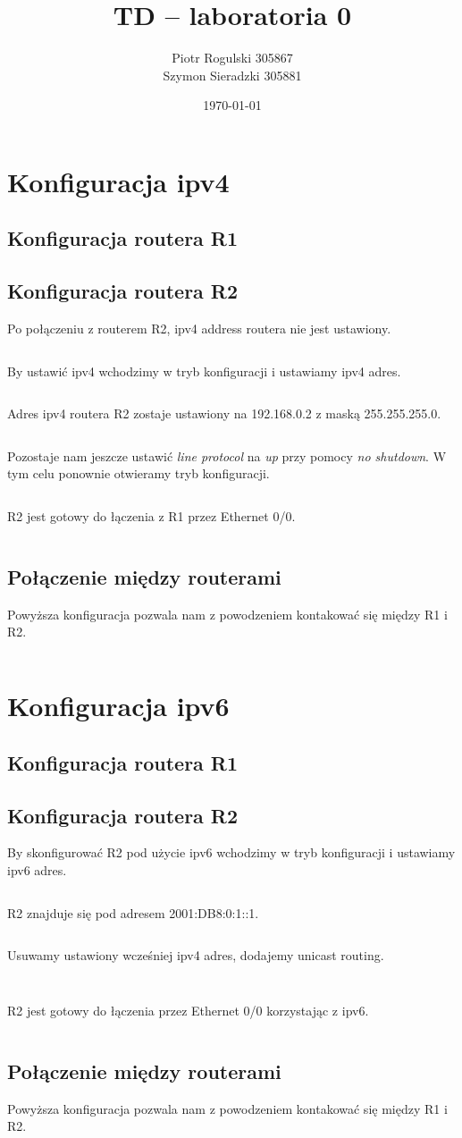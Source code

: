 \documentclass[a4paper,12pt,notitlepage]{article}
\title{\textbf{TD -- laboratoria 0}}
\author{Piotr Rogulski 305867 \\ Szymon Sieradzki 305881}
\date{\today}
\begin{document}
\maketitle


\section{Konfiguracja ipv4}
\subsection{Konfiguracja routera R1}
\subsection{Konfiguracja routera R2}
Po połączeniu z routerem R2, ipv4 address routera nie jest ustawiony.
\inputminted[label=Output, firstline=88, lastline=111]{text}{R2.txt}
By ustawić ipv4 wchodzimy w tryb konfiguracji i ustawiamy ipv4 adres.
\inputminted[label=Output, firstline=113, lastline=120]{text}{R2.txt}
Adres ipv4 routera R2 zostaje ustawiony na 192.168.0.2 z maską 255.255.255.0.
\inputminted[label=Output, firstline=121, lastline=144]{text}{R2.txt}
Pozostaje nam jeszcze ustawić \textit{line protocol} na \textit{up} przy pomocy \textit{no shutdown}. W tym celu ponownie otwieramy tryb konfiguracji.
\inputminted[label=Output, firstline=147, lastline=157]{text}{R2.txt}
R2 jest gotowy do łączenia z R1 przez Ethernet 0/0.
\inputminted[label=Output, firstline=162, lastline=185]{text}{R2.txt}
\subsection{Połączenie między routerami}
Powyższa konfiguracja pozwala nam z powodzeniem kontakować się między R1 i R2.
\inputminted[label=Output, firstline=193, lastline=216]{text}{R2.txt}
\section{Konfiguracja ipv6}
\subsection{Konfiguracja routera R1}
\subsection{Konfiguracja routera R2}
By skonfigurować R2 pod użycie ipv6 wchodzimy w tryb konfiguracji i ustawiamy ipv6 adres.
\inputminted[label=Output, firstline=272, lastline=283]{text}{R2.txt}
R2 znajduje się pod adresem 2001:DB8:0:1::1.
\inputminted[label=Output, firstline=309, lastline=323]{text}{R2.txt}
Usuwamy ustawiony wcześniej ipv4 adres, dodajemy unicast routing.
\inputminted[label=Output, firstline=324, lastline=329]{text}{R2.txt}
\inputminted[label=Output, firstline=376, lastline=382]{text}{R2.txt}
R2 jest gotowy do łączenia przez Ethernet 0/0 korzystając z ipv6.
\inputminted[label=Output, firstline=383, lastline=402]{text}{R2.txt}
\subsection{Połączenie między routerami}
Powyższa konfiguracja pozwala nam z powodzeniem kontakować się między R1 i R2.
\inputminted[label=Output, firstline=416, lastline=427]{text}{R2.txt}
\end{document}

